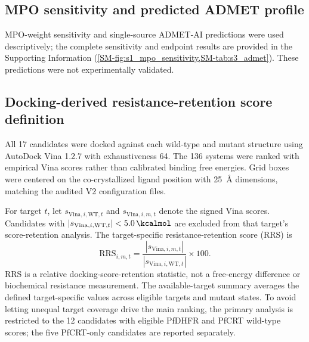 \documentclass[journal=jcisd8,manuscript=article,layout=traditional]{achemso}
\begin{document}
\subsection{MPO sensitivity and predicted ADMET profile}

MPO-weight sensitivity and single-source ADMET-AI predictions were used descriptively; the complete sensitivity and endpoint results are provided in the Supporting Information (\cref{SM-fig:s1_mpo_sensitivity,SM-tab:s3_admet}). These predictions were not experimentally validated.

\subsection{Docking-derived resistance-retention score definition}\label{sec:rrs_formula}

All 17 candidates were docked against each wild-type and mutant structure using AutoDock Vina 1.2.7 with exhaustiveness \num{64}. The 136 systems were ranked with empirical Vina scores rather than calibrated binding free energies. Grid boxes were centered on the co-crystallized ligand position with \qty{25}{\angstrom} dimensions, matching the audited V2 configuration files.

For target $t$, let $s_{\mathrm{Vina},i,\mathrm{WT},t}$ and $s_{\mathrm{Vina},i,m,t}$ denote the signed Vina scores. Candidates with $|s_{\mathrm{Vina},i,\mathrm{WT},t}| < \qty{5.0}{\kcalmol}$ are excluded from that target's score-retention analysis. The target-specific resistance-retention score (RRS) is
\begin{equation}
\mathrm{RRS}_{i,m,t} = \frac{|s_{\mathrm{Vina},i,m,t}|}{|s_{\mathrm{Vina},i,\mathrm{WT},t}|} \times 100.
\end{equation}
RRS is a relative docking-score-retention statistic, not a free-energy difference or biochemical resistance measurement. The available-target summary averages the defined target-specific values across eligible targets and mutant states. To avoid letting unequal target coverage drive the main ranking, the primary analysis is restricted to the 12 candidates with eligible PfDHFR and PfCRT wild-type scores; the five PfCRT-only candidates are reported separately.
\end{document}
